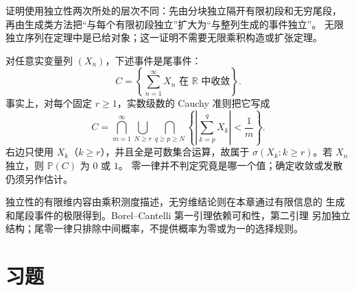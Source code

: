 证明使用独立性两次所处的层次不同：先由分块独立隔开有限初段和无穷尾段，
再由生成类方法把“与每个有限初段独立”扩大为“与整列生成的事件独立”。
无限独立序列在定理中是已给对象；这一证明不需要无限乘积构造或扩张定理。

\begin{example}[随机级数的收敛事件]
对任意实变量列 $(X_n)$，下述事件是尾事件：
\[
 C=\left\{\sum_{n=1}^{\infty}X_n\text{ 在 }\mathbb R\text{ 中收敛}\right\}.
\]
事实上，对每个固定 $r\ge1$，实数级数的 Cauchy 准则把它写成
\[
 C=\bigcap_{m=1}^{\infty}\bigcup_{N\ge r}
       \bigcap_{q\ge p\ge N}
       \left\{\left|\sum_{k=p}^qX_k\right|<\frac1m\right\}.
\]
右边只使用 $X_k$（$k\ge r$），并且全是可数集合运算，故属于
$\sigma(X_k:k\ge r)$。若 $X_n$ 独立，则 $\mathbb P(C)$ 为 $0$ 或 $1$。
零一律并不判定究竟是哪一个值；确定收敛或发散仍须另作估计。
\end{example}

独立性的有限维内容由乘积测度描述，无穷维结论则在本章通过有限信息的
生成和尾段事件的极限得到。Borel--Cantelli 第一引理依赖可和性，第二引理
另加独立结构；尾零一律只排除中间概率，不提供概率为零或为一的选择规则。

\section*{习题}

